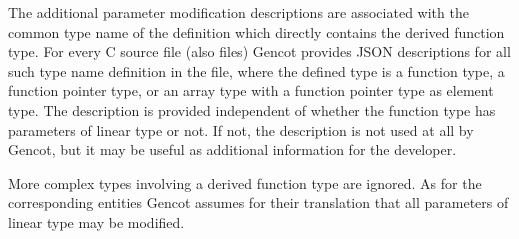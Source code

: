 The additional parameter modification descriptions are associated with the common type name of the definition
which directly contains the derived function type. For every C source file (also 
 files) Gencot provides JSON descriptions for all such type name definition in the file, where the defined
type is a function type, a function pointer type, or an array type with a function pointer type
as element type. The
description is provided independent of whether the function type has parameters of linear type or not. If not,
the description is not used at all by Gencot, but it may be useful as additional information for the developer.

More complex types involving a derived function type are ignored. As for the corresponding
entities Gencot assumes for their translation that all parameters of linear type may be modified.

